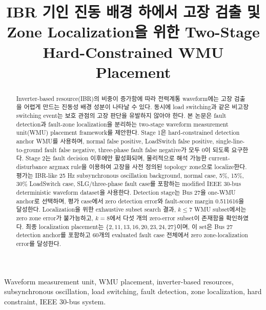 \documentclass[conference]{IEEEtran}
\begin{document}
\title{IBR 기인 진동 배경 하에서 고장 검출 및 Zone Localization을 위한 Two-Stage Hard-Constrained WMU Placement}

\author{%
}

\maketitle

\begin{abstract}
Inverter-based resource(IBR)의 비중이 증가함에 따라 전력계통 waveform에는 고장 검출을 어렵게 만드는 진동성 배경 성분이 나타날 수 있다. 동시에 load switching과 같은 비고장 switching event는 보호 관점의 고장 판단을 유발하지 않아야 한다. 본 논문은 fault detection과 fault-zone localization을 분리하는 two-stage waveform measurement unit(WMU) placement framework를 제안한다. Stage 1은 hard-constrained detection anchor WMU를 사용하며, normal false positive, LoadSwitch false positive, single-line-to-ground fault false negative, three-phase fault false negative가 모두 0이 되도록 요구한다. Stage 2는 fault decision 이후에만 활성화되며, 물리적으로 해석 가능한 current-disturbance argmax rule을 이용하여 고장을 사전 정의된 topology zone으로 localize한다. 평가는 IBR-like 25 Hz subsynchronous oscillation background, normal case, 5\%, 15\%, 30\% LoadSwitch case, SLG/three-phase fault case를 포함하는 modified IEEE 30-bus deterministic waveform dataset을 사용한다. Detection stage는 Bus 27을 one-WMU anchor로 선택하며, 평가 case에서 zero detection error와 fault-score margin 0.511616을 달성한다. Localization을 위한 exhaustive subset search 결과, $k\leq 7$ WMU subset에서는 zero zone error가 불가능하고, $k=8$에서 다섯 개의 zero-error subset이 존재함을 확인하였다. 최종 localization placement는 $\{2,11,13,16,20,23,24,27\}$이며, 이 set은 Bus 27 detection anchor를 포함하고 60개의 evaluated fault case 전체에서 zero zone-localization error를 달성한다.
\end{abstract}

\begin{IEEEkeywords}
Waveform measurement unit, WMU placement, inverter-based resources, subsynchronous oscillation, load switching, fault detection, zone localization, hard constraint, IEEE 30-bus system.
\end{IEEEkeywords}
\end{document}
